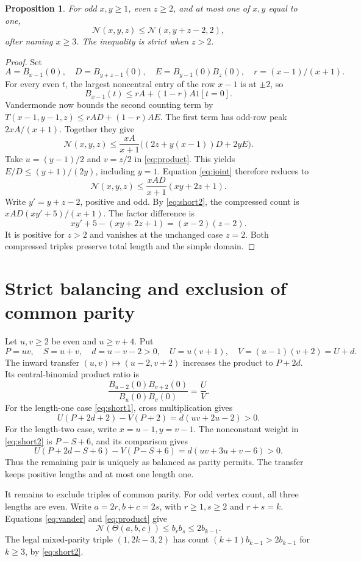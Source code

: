 \documentclass[11pt]{article}
\newtheorem{proposition}[theorem]{Proposition}
\theoremstyle{remark}
\newcommand{\Th}{\Theta}
\newcommand{\N}{\mathcal N}
\begin{document}
\begin{proposition}\label{prop:odd}
For odd $x,y\ge1$, even $z\ge2$, and at most one of $x,y$ equal to one,
\[
 \N(x,y,z)\le\N(x,y+z-2,2),
\]
after naming $x\ge3$. The inequality is strict when $z>2$.
\end{proposition}
\begin{proof}
Set
\[
 A=B_{x-1}(0),\quad D=B_{y+z-1}(0),\quad
 E=B_{y-1}(0)B_z(0),\quad r=(x-1)/(x+1).
\]
For every even $t$, the largest noncentral entry of the row $x-1$ is
at $\pm2$, so
\[
 B_{x-1}(t)\le rA+(1-r)A1[t=0].
\]
Vandermonde now bounds the second counting term by
$T(x-1,y-1,z)\le rAD+(1-r)AE$. The first term has odd-row peak
$2xA/(x+1)$. Together they give
\begin{equation}\label{eq:joint}
 \N(x,y,z)\le\frac{xA}{x+1}
 \bigl((2z+y(x-1))D+2yE\bigr).
\end{equation}
Take $u=(y-1)/2$ and $v=z/2$ in \eqref{eq:product}. This yields
$E/D\le(y+1)/(2y)$, including $y=1$. Equation \eqref{eq:joint}
therefore reduces to
\[
 \N(x,y,z)\le\frac{xAD}{x+1}(xy+2z+1).
\]
Write $y'=y+z-2$, positive and odd. By \eqref{eq:short2}, the compressed
count is $xAD(xy'+5)/(x+1)$. The factor difference is
\[
 xy'+5-(xy+2z+1)=(x-2)(z-2).
\]
It is positive for $z>2$ and vanishes at the unchanged case $z=2$.
Both compressed triples preserve total length and the simple domain.
\end{proof}

\section{Strict balancing and exclusion of common parity}
Let $u,v\ge2$ be even and $u\ge v+4$. Put
\[
 P=uv,\quad S=u+v,\quad d=u-v-2>0,\quad
 U=u(v+1),\quad V=(u-1)(v+2)=U+d.
\]
The inward transfer $(u,v)\mapsto(u-2,v+2)$ increases the product to
$P+2d$. Its central-binomial product ratio is
\[
 \frac{B_{u-2}(0)B_{v+2}(0)}{B_u(0)B_v(0)}=\frac UV.
\]
For the length-one case \eqref{eq:short1}, cross multiplication gives
\[
 U(P+2d+2)-V(P+2)=d(uv+2u-2)>0.
\]
For the length-two case, write $x=u-1,y=v-1$. The nonconstant weight
in \eqref{eq:short2} is $P-S+6$, and its comparison gives
\[
 U(P+2d-S+6)-V(P-S+6)=d(uv+3u+v-6)>0.
\]
Thus the remaining pair is uniquely as balanced as parity permits.
The transfer keeps positive lengths and at most one length one.

It remains to exclude triples of common parity. For odd vertex count,
all three lengths are even. Write $a=2r,b+c=2s$, with $r\ge1,s\ge2$
and $r+s=k$. Equations \eqref{eq:vander} and \eqref{eq:product} give
\[
 \N(\Th(a,b,c))\le b_rb_s\le2b_{k-1}.
\]
The legal mixed-parity triple $(1,2k-3,2)$ has count
$(k+1)b_{k-1}>2b_{k-1}$ for $k\ge3$, by \eqref{eq:short2}.
\end{document}
